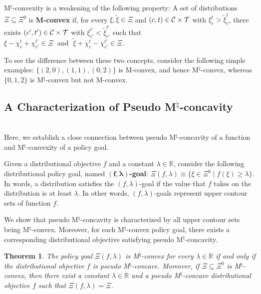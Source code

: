 \documentclass[12pt]{amsart}
\newtheorem{theorem}{Theorem}
\theoremstyle{remark}
\begin{document}
M$^{\natural}$-convexity is a weakening of the following property:
A set of distributions $\Xi\subseteq \Xi^0$ is \textbf{M-convex} if, for every $\xi,\tilde{\xi} \in \Xi$ and $(c,t) \in \mathcal{C} \times \mathcal{T}$ with $\xi_c^t>\tilde{\xi}_c^t$,
there exists $(c',t') \in \mathcal{C} \times \mathcal{T}$ with $\xi_{c'}^{t'}<\tilde{\xi}_{c'}^{t'}$ such that
$\xi-\chi_c^t+\chi_{c'}^{t'}\in \Xi \; \mbox{ and } \; \tilde{\xi}+\chi_c^t-\chi_{c'}^{t'} \in \Xi$.

To see the difference between these two concepts, consider the following simple examples:
$\{(2,0),(1,1),(0,2)\}$ is M-convex, and hence M$^{\natural}$-convex, whereas $\{0,1,2\}$ is M$^{\natural}$-convex but not M-convex.




\subsection{A Characterization of Pseudo M$^{\natural}$-concavity}\hfill\\
Here, we establish a close
connection between pseudo M$^{\natural}$-concavity of a function and M$^{\natural}$-convexity of a policy goal.


 Given a distributional objective $f$ and a constant $\lambda \in \mathbb{R}$, consider the following distributional policy goal, named $\boldsymbol{(f,\lambda)}$\textbf{-goal}:
$\Xi(f,\lambda) \equiv \{\xi \in \Xi^0 \mid f(\xi)\geq \lambda\}$. In words, a distribution satisfies the $(f,\lambda)$-goal if the value that $f$ takes
on the distribution is at least $\lambda$. %
In other words, $(f,\lambda)$-goals represent upper contour sets of function $f$.

We show that pseudo M$^{\natural}$-concavity is characterized by all upper contour sets being M$^{\natural}$-convex.
Moreover, for each M$^{\natural}$-convex policy goal, there exists a corresponding distributional objective satisfying pseudo M$^{\natural}$-concavity.

\begin{theorem}\label{thm:characterization}
The policy goal $\Xi(f,\lambda)$ is M$^{\natural}$-convex for every $\lambda \in \mathbb{R}$ if and only if the distributional objective
$f$ is pseudo M$^{\natural}$-concave. Moreover, if $\Xi \subseteq \Xi^0$ is M$^{\natural}$-convex, then there exist a constant $\lambda \in \mathbb{R}$ and
a pseudo M$^{\natural}$-concave distributional objective $f$ such that $\Xi(f,\lambda)  = \Xi$.
\end{theorem}
\end{document}
